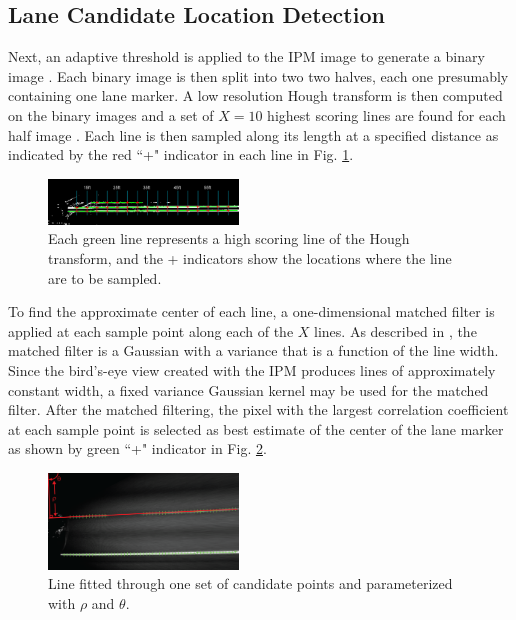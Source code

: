 \documentclass{article}
\begin{document}
\subsection{Lane Candidate Location Detection}
Next, an adaptive threshold is applied to the IPM image to generate a binary image \cite{borkar_layered_2009}. Each binary image is then split into two two halves, each one presumably containing one lane marker.
A low resolution Hough transform is then computed on the binary images and a set of $X=10$ highest scoring lines are found for each half image \cite{borkar_layered_2009}. Each line is then sampled along its length at a specified distance as indicated by the red ``+" indicator in each line in Fig. \ref{fig:sampling_points}.
\begin{figure}[htb]
  \centering
  \includegraphics[width=0.45\textwidth]{IMG/cand_lane_points.png}
  \caption{Each green line represents a high scoring line of the Hough transform, and the + indicators show the locations where the line are to be sampled.}
  \label{fig:sampling_points}
\end{figure}
To find the approximate center of each line, a one-dimensional matched filter is applied at each sample point along each of the $X$ lines.
As described in \cite{borkar_layered_2009}, the matched filter is a Gaussian with a variance that is a function of the line width.
Since the bird's-eye view created with the IPM produces lines of approximately constant width, a fixed variance Gaussian kernel may be used for the matched filter.
After the matched filtering, the pixel with the largest correlation coefficient at each sample point is selected as best estimate of the center of the lane marker as shown by green ``+" indicator in Fig. \ref{fig:cand_pts}.
\begin{figure}[htb]
  \centering
  \includegraphics[width=0.45\textwidth]{IMG/rho_theta.png}
  \caption{Line fitted through one set of candidate points and parameterized with $\rho$ and $\theta$.}
  \label{fig:cand_pts}
\end{figure}
\end{document}
